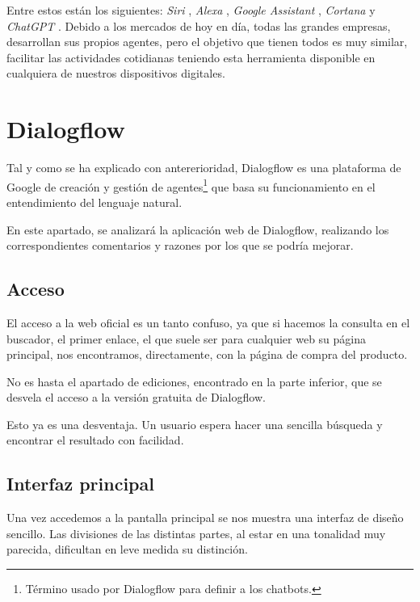 Entre estos están los siguientes: \textit{Siri} \cite{SiriAppl32:online}, \textit{Alexa} \cite{AmazonAl60:online}, \textit{Google Assistant} \cite{Asistent39:online}, \textit{Cortana} \cite{Cortana96:online} y \textit{ChatGPT} \cite{ChatGPT91:online}. Debido a los mercados de hoy en día, todas las grandes empresas, desarrollan sus propios agentes, pero el objetivo que tienen todos es muy similar, facilitar las actividades cotidianas teniendo esta herramienta disponible en cualquiera de nuestros dispositivos digitales.


\section{Dialogflow}
Tal y como se ha explicado con antererioridad, Dialogflow es una plataforma de Google de creación y gestión de agentes\footnote{Término usado por Dialogflow para definir a los chatbots.} que basa su funcionamiento en el entendimiento del lenguaje natural.

En este apartado, se analizará la aplicación web de Dialogflow, realizando los correspondientes comentarios y razones por los que se podría mejorar.

\subsection{Acceso}
El acceso a la web oficial es un tanto confuso, ya que si hacemos la consulta en el buscador, el primer enlace, el que suele ser para cualquier web su página principal, nos encontramos, directamente, con la página de compra del producto.


No es hasta el apartado de ediciones, encontrado en la parte inferior, que se desvela el acceso a la versión gratuita de Dialogflow.

Esto ya es una desventaja. Un usuario espera hacer una sencilla búsqueda y encontrar el resultado con facilidad.

\subsection{Interfaz principal}
Una vez accedemos a la pantalla principal se nos muestra una interfaz de diseño sencillo. Las divisiones de las distintas partes, al estar en una tonalidad muy parecida, dificultan en leve medida su distinción.

